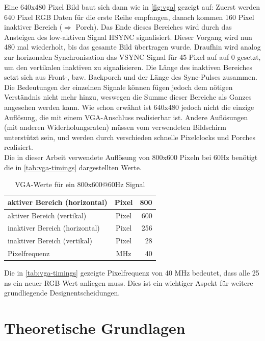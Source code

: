 \documentclass[a4paper,12pt,onesided]{report}
\begin{document}
Eine 640x480 Pixel Bild baut sich dann wie in \autoref{fig:vga} gezeigt auf:
Zuerst werden 640 Pixel RGB Daten für die erste Reihe empfangen, danach kommen 160 Pixel inaktiver Bereich ($\Rightarrow$ Porch). Das Ende dieses Bereiches wird durch das Ansteigen des low-aktiven Signal HSYNC signalisiert. Dieser Vorgang wird nun 480 mal wiederholt, bis das gesamte Bild übertragen wurde. Draufhin wird analog zur horizonalen Synchronisation das VSYNC Signal für 45 Pixel auf auf 0 gesetzt, um den vertikalen inaktiven zu signalisieren. Die Länge des inaktiven Bereiches setzt sich aus Front-, bzw. Backporch und der Länge des Sync-Pulses zusammen. Die Bedeutungen der einzelnen Signale können fügen jedoch dem nötigen Verständnis nicht mehr hinzu, weswegen die Summe dieser Bereiche als Ganzes angesehen werden kann.
Wie schon erwähnt ist 640x480 jedoch nicht die einzige Auflösung, die mit einem VGA-Anschluss realisierbar ist. Andere Auflösungen (mit anderen Widerholungsraten) müssen vom verwendeten Bildschirm unterstützt sein, und werden durch verschieden schnelle Pixelclocks und Porches realisiert.\\
Die in dieser Arbeit verwendete Auflösung von 800x600 Pixeln bei 60Hz benötigt die in \autoref{tab:vga-timings} dargestellten Werte.

\begin{table}[H]
	\centering
	\begin{tabular}{|l|c|r|}	
		\hline
		aktiver Bereich (horizontal) & Pixel & 800 \\ \hline
		aktiver Bereich (vertikal) & Pixel & 600 \\ \hline
		inaktiver Bereich (horizontal) & Pixel & 256 \\ \hline
		inaktiver Bereich (vertikal) & Pixel & 28 \\ \hline
		Pixelfrequenz & MHz & 40 \\ \hline
	\end{tabular}
	\caption{VGA-Werte für ein 800x600@60Hz Signal}
	\label{tab:vga-timings}
\end{table}

Die in \autoref{tab:vga-timings} gezeigte Pixelfrequenz von 40 MHz bedeutet, dass alle 25 ns ein neuer RGB-Wert anliegen muss. Dies ist ein wichtiger Aspekt für weitere grundliegende Designentscheidungen. %

\chapter{Theoretische Grundlagen}
\end{document}
